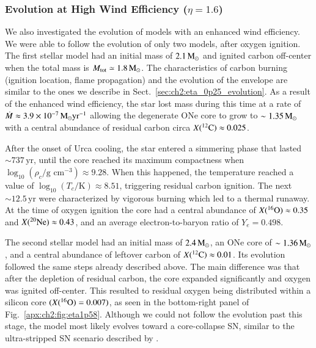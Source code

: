 \documentclass[main.tex]{subfiles}
\begin{document}
\subsubsection{Evolution at High Wind Efficiency ($\eta = 1.6$)} \label{sec:ch2:eta_1p58_evolution}
We also investigated the evolution of models with an enhanced wind efficiency. We were able to follow the evolution of only two models, after oxygen ignition. The first stellar model had an initial mass of $2.1\msun$ and ignited carbon off-center when the total mass is $M_\text{tot} \simeq 1.8\msun$. The characteristics of carbon burning (ignition location, flame propagation) and the evolution of the envelope are similar to the ones we describe in Sect.~\ref{sec:ch2:eta_0p25_evolution}. As a result of the enhanced wind efficiency, the star lost mass during this time at a rate of $\dot{M} \approx 3.9 \times 10^{-7}\msun \text{yr}^{-1}$ allowing the degenerate ONe core to grow to $\sim 1.35\msun$ with a central abundance of residual carbon circa $X(\iso{C}{12}) \approx 0.025$. 

After the onset of Urca cooling, the star entered a simmering phase that lasted $\sim 737\,\text{yr}$, until the core reached its maximum compactness when $\log_{10} (\rho_c / \text{g cm}^{-3}) \approx 9.28 $. When this happened, the temperature reached a value of $\log_{10} (T_c / \text{K}) \approx 8.51$, triggering residual carbon ignition. The next $\sim 12.5\,\text{yr}$ were  characterized by vigorous burning which led to a thermal runaway. At the time of oxygen ignition the core had a central abundance of  $X(\iso{O}{16}) \approx 0.35$ and $X(\iso{Ne}{20}) \approx 0.43$, and an average electron-to-baryon ratio of $Y_e = 0.498$.

The second stellar model had an initial mass of $2.4\msun$, an ONe core of $\sim 1.36\msun$, and a central abundance of leftover carbon of $X(\iso{C}{12}) \approx 0.01$. Its evolution followed the same steps already described above. The main difference was that after the depletion of residual carbon, the core expanded significantly and oxygen was ignited off-center. This resulted to  residual oxygen being distributed within a silicon core $(X(\iso{O}{16}) = 0.007)$, as seen in the bottom-right panel of Fig.~\ref{apx:ch2:fig:eta1p58}.
Although we could not follow the evolution past this stage, the model most likely evolves toward a core-collapse SN, similar to the ultra-stripped SN scenario described by \cite{Tauris:2015xra}.
\end{document}
